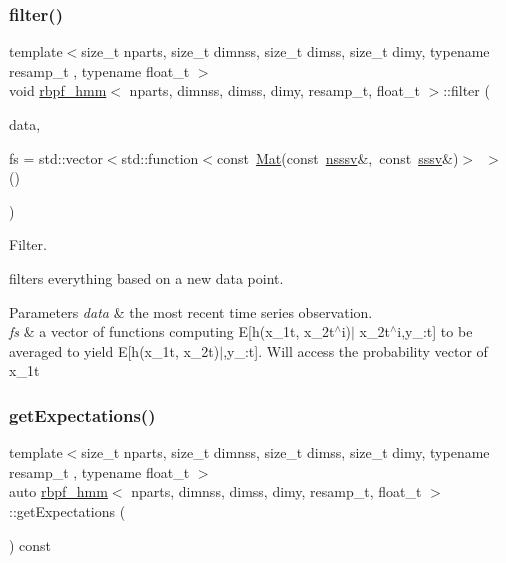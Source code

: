 \subsubsection{\texorpdfstring{filter()}{filter()}}
{\footnotesize\ttfamily template$<$size\+\_\+t nparts, size\+\_\+t dimnss, size\+\_\+t dimss, size\+\_\+t dimy, typename resamp\+\_\+t , typename float\+\_\+t $>$ \\
void \hyperlink{classrbpf__hmm}{rbpf\+\_\+hmm}$<$ nparts, dimnss, dimss, dimy, resamp\+\_\+t, float\+\_\+t $>$\+::filter (\begin{DoxyParamCaption}\item[{const \hyperlink{classrbpf__hmm_adafd37687fdd3bb776d3d33a5b0e7080}{osv} \&}]{data,  }\item[{const std\+::vector$<$ std\+::function$<$ const \hyperlink{classrbpf__hmm_ac32aaf9833767d6886f732243a77aa66}{Mat}(const \hyperlink{classrbpf__hmm_a7988465662f94f2ba45fd22566828d0f}{nsssv} \&x1t\+Probs, const \hyperlink{classrbpf__hmm_a28e8ad1d93bcf53cb74603f74826a81c}{sssv} \&x2t)$>$ $>$ \&}]{fs = {\ttfamily std\+:\+:vector$<$std\+:\+:function$<$const~\hyperlink{classrbpf__hmm_ac32aaf9833767d6886f732243a77aa66}{Mat}(const~\hyperlink{classrbpf__hmm_a7988465662f94f2ba45fd22566828d0f}{nsssv}\&,~const~\hyperlink{classrbpf__hmm_a28e8ad1d93bcf53cb74603f74826a81c}{sssv}\&)$>$~$>$()} }\end{DoxyParamCaption})}



Filter. 

filters everything based on a new data point. 
\begin{DoxyParams}{Parameters}
{\em data} & the most recent time series observation. \\
\hline
{\em fs} & a vector of functions computing E\mbox{[}h(x\+\_\+1t, x\+\_\+2t$^\wedge$i)$\vert$ x\+\_\+2t$^\wedge$i,y\+\_\+:t\mbox{]} to be averaged to yield E\mbox{[}h(x\+\_\+1t, x\+\_\+2t)$\vert$,y\+\_\+:t\mbox{]}. Will access the probability vector of x\+\_\+1t \\
\hline
\end{DoxyParams}
\mbox{\label{classrbpf__hmm_a98b2d1e39e0a092a000866d1cda7e701}} 
\subsubsection{\texorpdfstring{get\+Expectations()}{getExpectations()}}
{\footnotesize\ttfamily template$<$size\+\_\+t nparts, size\+\_\+t dimnss, size\+\_\+t dimss, size\+\_\+t dimy, typename resamp\+\_\+t , typename float\+\_\+t $>$ \\
auto \hyperlink{classrbpf__hmm}{rbpf\+\_\+hmm}$<$ nparts, dimnss, dimss, dimy, resamp\+\_\+t, float\+\_\+t $>$\+::get\+Expectations (\begin{DoxyParamCaption}{ }\end{DoxyParamCaption}) const}



